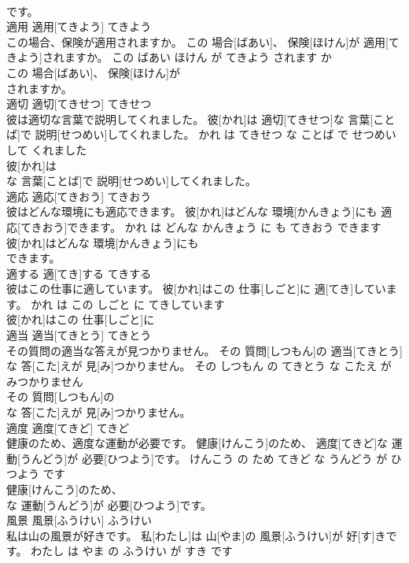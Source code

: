 \documentclass[8pt]{extreport}
\begin{document}
\begin{CJK}{UTF8}{min}
\\	です。			
\\	適用	適用[てきよう]	てきよう	
\\	この場合、保険が適用されますか。	この 場合[ばあい]、 保険[ほけん]が 適用[てきよう]されますか。	この ばあい ほけん が てきよう されます か	
\\	この 場合[ばあい]、 保険[ほけん]が
\\	されますか。			
\\	適切	適切[てきせつ]	てきせつ	
\\	彼は適切な言葉で説明してくれました。	彼[かれ]は 適切[てきせつ]な 言葉[ことば]で 説明[せつめい]してくれました。	かれ は てきせつ な ことば で せつめい して くれました	
\\	彼[かれ]は
\\	な 言葉[ことば]で 説明[せつめい]してくれました。			
\\	適応	適応[てきおう]	てきおう	
\\	彼はどんな環境にも適応できます。	彼[かれ]はどんな 環境[かんきょう]にも 適応[てきおう]できます。	かれ は どんな かんきょう に も てきおう できます	
\\	彼[かれ]はどんな 環境[かんきょう]にも
\\	できます。			
\\	適する	適[てき]する	てきする	
\\	彼はこの仕事に適しています。	彼[かれ]はこの 仕事[しごと]に 適[てき]しています。	かれ は この しごと に てきしています	
\\	彼[かれ]はこの 仕事[しごと]に
\\	適当	適当[てきとう]	てきとう	
\\	その質問の適当な答えが見つかりません。	その 質問[しつもん]の 適当[てきとう]な 答[こた]えが 見[み]つかりません。	その しつもん の てきとう な こたえ が みつかりません	
\\	その 質問[しつもん]の
\\	な 答[こた]えが 見[み]つかりません。			
\\	適度	適度[てきど]	てきど	
\\	健康のため、適度な運動が必要です。	健康[けんこう]のため、 適度[てきど]な 運動[うんどう]が 必要[ひつよう]です。	けんこう の ため てきど な うんどう が ひつよう です	
\\	健康[けんこう]のため、
\\	な 運動[うんどう]が 必要[ひつよう]です。			
\\	風景	風景[ふうけい]	ふうけい	
\\	私は山の風景が好きです。	私[わたし]は 山[やま]の 風景[ふうけい]が 好[す]きです。	わたし は やま の ふうけい が すき です	

\end{CJK}
\end{document}
